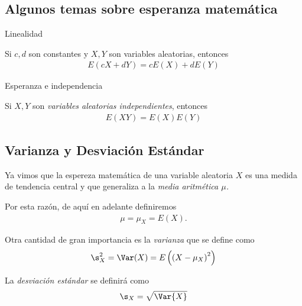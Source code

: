\subsection{Algunos temas sobre esperanza matemática}
{Linealidad}
 \begin{teorema}
  \label{thm:0.3.1}
  Si $c,d$ son constantes y $X,Y$ son variables aleatorias, entonces
  \begin{align}
   \label{eq:0.3.lin}
   E\left( cX+dY \right)=
   cE\left( X \right)+dE\left( Y \right)
  \end{align}

 \end{teorema}


{Esperanza e independencia}
 \begin{teorema}
  \label{thm:0.3.3} Si $X,Y$ son \emph{variables aleatorias independientes}, entonces
  \begin{align}
   \label{eq:0.3.10}
   E\left( XY \right)=E(X)E(Y)
  \end{align}

 \end{teorema}



\subsection{Varianza y Desviación Estándar}

 Ya vimos que la espereza matemática de una variable aleatoria $X$ es una medida de tendencia central y que generaliza a la \emph{media aritmética $\mu$.}
 

\begin{observacion}
 Por esta razón, de aquí en adelante definiremos
 \begin{align}
  \mu=\mu_{X}=E(X).
 \end{align}

\end{observacion}

 


 Otra cantidad de gran importancia es la \emph{varianza} que se define como
 \begin{align}
  \label{eq:0.3.11}
  \s_{X}^{2}=\Var(X)=E\left( \left( X-\mu_{X} \right)^{2} \right)
 \end{align}



 La \emph{desviación estándar} se definirá como
 \begin{align}
  \label{eq:0.3.12}
  \s_{X} = \sqrt{\Var{X}}
 \end{align}



